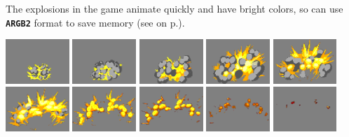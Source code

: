 \documentclass[10pt]{book}
\newcommand{\mach}[1]{\texttt{\textbf{#1}}}
\newcommand{\xref}[1]{\textit{\nameref{#1}} on  p.\pageref{#1}}
\begin{document}
The explosions in the game animate quickly and have bright colors, so can
use \mach{ARGB2} format to save memory (see \xref{eightbit}).

\begin{center}
\includegraphics[width=0.18\textwidth]{previews/nightstrike_0-EXPLODE_BIG-00.png}
\includegraphics[width=0.18\textwidth]{previews/nightstrike_0-EXPLODE_BIG-01.png}
\includegraphics[width=0.18\textwidth]{previews/nightstrike_0-EXPLODE_BIG-02.png}
\includegraphics[width=0.18\textwidth]{previews/nightstrike_0-EXPLODE_BIG-03.png}
\includegraphics[width=0.18\textwidth]{previews/nightstrike_0-EXPLODE_BIG-04.png}
\includegraphics[width=0.18\textwidth]{previews/nightstrike_0-EXPLODE_BIG-05.png}
\includegraphics[width=0.18\textwidth]{previews/nightstrike_0-EXPLODE_BIG-06.png}
\includegraphics[width=0.18\textwidth]{previews/nightstrike_0-EXPLODE_BIG-07.png}
\includegraphics[width=0.18\textwidth]{previews/nightstrike_0-EXPLODE_BIG-08.png}
\includegraphics[width=0.18\textwidth]{previews/nightstrike_0-EXPLODE_BIG-09.png}
\end{center}
\end{document}
